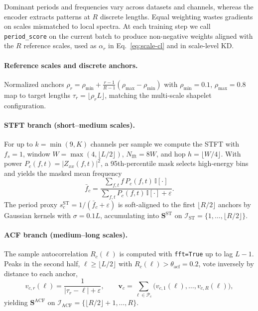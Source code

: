 \documentclass[sigconf]{acmart}
\begin{document}
Dominant periods and frequencies vary across datasets and channels, whereas the
encoder extracts patterns at $R$ discrete lengths. Equal weighting wastes
gradients on scales mismatched to local spectra. At each training step we call
\texttt{period\_score} on the current batch to produce non-negative weights
aligned with the $R$ reference scales, used as $\alpha_r$ in
Eq.~\eqref{eq:scale-cl} and in scale-level KD.

\paragraph{Reference scales and discrete anchors.}
Normalized anchors $\rho_r=\rho_{\min}+\frac{r-1}{R-1}(\rho_{\max}-\rho_{\min})$
with $\rho_{\min}=0.1$, $\rho_{\max}=0.8$ map to target lengths
$\tau_r=\lfloor \rho_r L \rfloor$, matching the multi-scale shapelet
configuration.

\paragraph{STFT branch (short--medium scales).}
For up to $k=\min(9,K)$ channels per sample we compute the STFT with $f_s=1$,
window $W=\max(4,\lfloor L/2\rfloor)$, $N_{\mathrm{fft}}=8W$, and hop
$h=\lfloor W/4\rfloor$. With power $P_c(f,t)=|Z_{xx}(f,t)|^2$, a 95th-percentile
mask selects high-energy bins and yields the masked mean frequency
\begin{equation}
\bar{f}_c=\frac{\sum_{f,t} f\,P_c(f,t)\,\mathbb{I}[\cdot]}
{\sum_{f,t} P_c(f,t)\,\mathbb{I}[\cdot]+\varepsilon}.
\end{equation}
The period proxy $s_c^{\mathrm{ST}}=1/(\bar{f}_c+\varepsilon)$ is soft-aligned to
the first $\lfloor R/2\rfloor$ anchors by Gaussian kernels with $\sigma=0.1L$,
accumulating into $\mathbf{S}^{\mathrm{ST}}$ on
$\mathcal{I}_{\mathrm{ST}}=\{1,\dots,\lfloor R/2\rfloor\}$.

\paragraph{ACF branch (medium--long scales).}
The sample autocorrelation $R_c(\ell)$ is computed with \texttt{fft=True} up to
lag $L-1$. Peaks in the second half, $\ell\ge\lfloor L/2\rfloor$ with
$R_c(\ell)>\theta_{\mathrm{acf}}=0.2$, vote inversely by distance to each anchor,
\begin{equation}
v_{c,r}(\ell)=\frac{1}{|\tau_r-\ell|+\varepsilon},\qquad
\mathbf{v}_c=\sum_{\ell\in\mathcal{P}_c}\bigl(v_{c,1}(\ell),\ldots,v_{c,R}(\ell)\bigr),
\end{equation}
yielding $\mathbf{S}^{\mathrm{ACF}}$ on
$\mathcal{I}_{\mathrm{ACF}}=\{\lfloor R/2\rfloor+1,\dots,R\}$.
\end{document}
